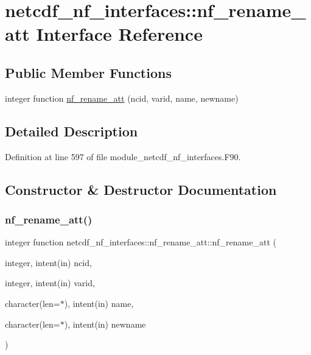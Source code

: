 \hypertarget{interfacenetcdf__nf__interfaces_1_1nf__rename__att}{}\section{netcdf\+\_\+nf\+\_\+interfaces\+:\+:nf\+\_\+rename\+\_\+att Interface Reference}
\label{interfacenetcdf__nf__interfaces_1_1nf__rename__att}
\subsection*{Public Member Functions}
\begin{DoxyCompactItemize}
\item 
integer function \hyperlink{interfacenetcdf__nf__interfaces_1_1nf__rename__att_ab48b63ac1a9527d1c85deadb6497748d}{nf\+\_\+rename\+\_\+att} (ncid, varid, name, newname)
\end{DoxyCompactItemize}


\subsection{Detailed Description}


Definition at line 597 of file module\+\_\+netcdf\+\_\+nf\+\_\+interfaces.\+F90.



\subsection{Constructor \& Destructor Documentation}
\mbox{\label{interfacenetcdf__nf__interfaces_1_1nf__rename__att_ab48b63ac1a9527d1c85deadb6497748d}} 
\subsubsection{\texorpdfstring{nf\+\_\+rename\+\_\+att()}{nf\_rename\_att()}}
{\footnotesize\ttfamily integer function netcdf\+\_\+nf\+\_\+interfaces\+::nf\+\_\+rename\+\_\+att\+::nf\+\_\+rename\+\_\+att (\begin{DoxyParamCaption}\item[{integer, intent(in)}]{ncid,  }\item[{integer, intent(in)}]{varid,  }\item[{character(len=$\ast$), intent(in)}]{name,  }\item[{character(len=$\ast$), intent(in)}]{newname }\end{DoxyParamCaption})}



